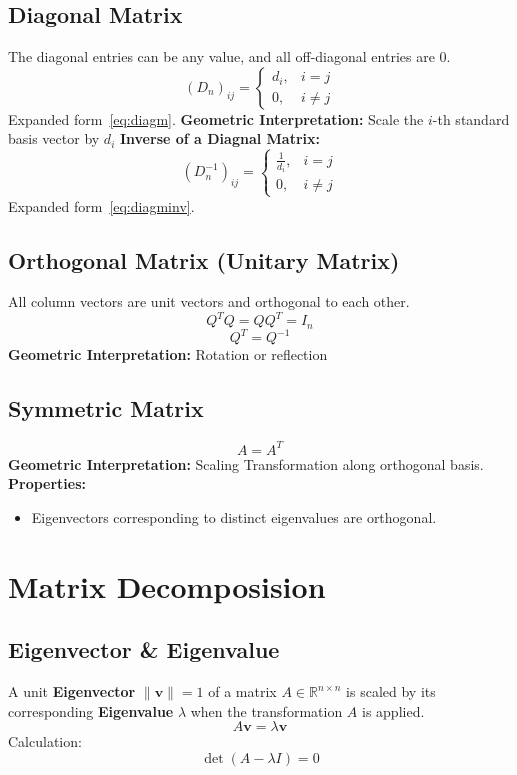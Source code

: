 \documentclass{article}
\begin{document}
\subsection{Diagonal Matrix}
The diagonal entries can be any value, and all off-diagonal entries are 0.
\[
    (D_n)_{ij} =
    \begin{cases}
        d_i, & i = j \\
        0, & i \neq j
    \end{cases}
\]
Expanded form~\ref{eq:diagm}.
\newline
\textbf{Geometric Interpretation:} Scale the $i$-th standard basis vector by $d_i$
\newline
\textbf{Inverse of a Diagnal Matrix:}
\[
    (D_n^{-1})_{ij} =
    \begin{cases}
        \frac{1}{d_i}, & i = j \\
        0, & i \neq j
    \end{cases}
\]
Expanded form~\ref{eq:diagminv}.

\subsection{Orthogonal Matrix (Unitary Matrix)}
All column vectors are unit vectors and orthogonal to each other.
\[
    Q^T Q = Q Q^T = I_n
\]
\[
    Q^T = Q^{-1}
\]
\textbf{Geometric Interpretation:} Rotation or reflection

\subsection{Symmetric Matrix}
\[
    A = A^T
\]
\textbf{Geometric Interpretation:} Scaling Transformation along orthogonal basis.
\newline
\textbf{Properties:}
\begin{itemize}
    \item Eigenvectors corresponding to distinct eigenvalues are orthogonal.
\end{itemize}


\newpage
\section{Matrix Decomposision}

\subsection{Eigenvector \& Eigenvalue}

A unit \textbf{Eigenvector} $\|\mathbf{v}\| = 1$ of a matrix $A \in \mathbb{R}^{n \times n}$ is scaled by its corresponding \textbf{Eigenvalue} $\lambda$ when the transformation $A$ is applied.
\[
    A\mathbf{v} = \lambda \mathbf{v}
\]
Calculation:
\[
    \det(A - \lambda I) = 0
\]
\end{document}
